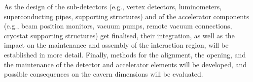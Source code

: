 As the design of the sub-detectors (e.g., vertex detectors, luminometers, superconducting pipes, supporting structures) 
and of the accelerator components (e.g., beam position monitors, vacuum pumps, remote vacuum connections, cryostat supporting structures) 
get finalised, their integration, as well as the impact on the maintenance and assembly of the interaction region, will be established in more detail. 
Finally, methods for the alignment, the opening, and the maintenance of the detector and accelerator elements 
will be developed, and possible consequences on the cavern dimensions will be evaluated.
